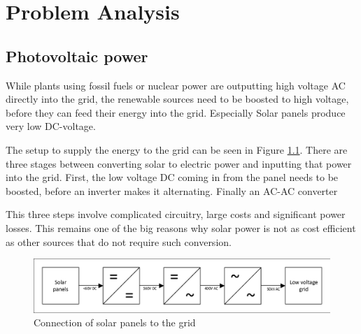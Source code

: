 \chapter{Problem Analysis}\label{ch:probdesc}



\section{Photovoltaic power}
While plants using fossil fuels or nuclear power are outputting high voltage AC directly into the grid, the renewable sources need to be boosted to high voltage, before they can feed their energy into the grid. 
Especially Solar panels produce very low DC-voltage. \cite{PanasonicSolarPanel}

The setup to supply the energy to the grid can be seen in Figure \ref{fig:SolarConverters}.
There are three stages between converting solar to electric power and inputting that power into the grid. 
First, the low voltage DC coming in from the panel needs to be boosted, before an inverter makes it alternating. Finally  an AC-AC converter 

This three steps involve complicated circuitry, large costs and significant power losses. 
This remains one of the big reasons why solar power is not as cost efficient as other sources that do not require such conversion.

\begin{figure}[H]
   \centering
   \includegraphics[width=\textwidth]{figures/Problem/SolarConverters.pdf}
    \caption{Connection of solar panels to the grid}
	\label{fig:SolarConverters}
\end{figure}

